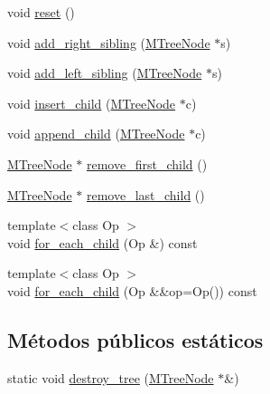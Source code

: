 \begin{DoxyCompactItemize}
\item 
void \hyperlink{class_designar_1_1_m_tree_node_a83e06dcf705a55bbf7a2963f7d95fdeb}{reset} ()
\item 
void \hyperlink{class_designar_1_1_m_tree_node_a7033b8c027740a78afd91813a77f6ece}{add\+\_\+right\+\_\+sibling} (\hyperlink{class_designar_1_1_m_tree_node}{M\+Tree\+Node} $\ast$s)
\item 
void \hyperlink{class_designar_1_1_m_tree_node_a393f9eb105d94c9a6cd13f09bead78aa}{add\+\_\+left\+\_\+sibling} (\hyperlink{class_designar_1_1_m_tree_node}{M\+Tree\+Node} $\ast$s)
\item 
void \hyperlink{class_designar_1_1_m_tree_node_a03c1d687b029121ab12d1f8f6ce5fe2f}{insert\+\_\+child} (\hyperlink{class_designar_1_1_m_tree_node}{M\+Tree\+Node} $\ast$c)
\item 
void \hyperlink{class_designar_1_1_m_tree_node_a3a78ef9097a315488694da92526b0bd1}{append\+\_\+child} (\hyperlink{class_designar_1_1_m_tree_node}{M\+Tree\+Node} $\ast$c)
\item 
\hyperlink{class_designar_1_1_m_tree_node}{M\+Tree\+Node} $\ast$ \hyperlink{class_designar_1_1_m_tree_node_a3923c9fceb148c7a4ad01c7e73360d50}{remove\+\_\+first\+\_\+child} ()
\item 
\hyperlink{class_designar_1_1_m_tree_node}{M\+Tree\+Node} $\ast$ \hyperlink{class_designar_1_1_m_tree_node_a4306d8860a10dabc42868e23d3871367}{remove\+\_\+last\+\_\+child} ()
\item 
{\footnotesize template$<$class Op $>$ }\\void \hyperlink{class_designar_1_1_m_tree_node_a50335e862976ee50c7d5958fdf717fc2}{for\+\_\+each\+\_\+child} (Op \&) const
\item 
{\footnotesize template$<$class Op $>$ }\\void \hyperlink{class_designar_1_1_m_tree_node_a6cb0e3e0b246cd11dee5017a5058f0b1}{for\+\_\+each\+\_\+child} (Op \&\&op=Op()) const
\end{DoxyCompactItemize}
\subsection*{Métodos públicos estáticos}
\begin{DoxyCompactItemize}
\item 
static void \hyperlink{class_designar_1_1_m_tree_node_a1cbf498a5d161f1cdb318295a4a9ec2e}{destroy\+\_\+tree} (\hyperlink{class_designar_1_1_m_tree_node}{M\+Tree\+Node} $\ast$\&)
\end{DoxyCompactItemize}


